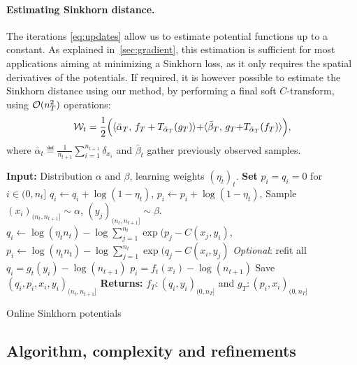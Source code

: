 \paragraph{Estimating Sinkhorn distance.} 

The iterations \eqref{eq:updates} allow us to estimate potential functions up to a constant. As explained in~\autoref{sec:gradient},
this estimation is sufficient for most applications aiming at minimizing a Sinkhorn loss, as it only requires the spatial derivatives of the potentials.
%
If required, it is however possible to estimate the Sinkhorn distance using our method, by performing a final soft $C$-transform, using $\Oo(n_T^2)$ operations:
\begin{equation}\label{eq-dist-est}
    \Ww_t = \frac{1}{2}\Big(\dotp{\bar \alpha_T}{f_T + \Ctrans{g_T}{\bar \alpha_T}}
     {+} \dotp{\bar \beta_T}{g_T {+} \Ctrans{f_T}{\bar \alpha_T}}\Big),
\end{equation}
where $\bar \alpha_t \eqdef \frac{1}{n_{t+1}}\sum_{i=1}^{n_{t+1}} \delta_{x_i}$
and $\bar \beta_t$ gather previously observed samples.

\begin{algorithm}[t]
    \begin{algorithmic}
    \State \textbf{Input:} Distribution $\alpha$ and $\beta$, learning weights ${(\eta_t)}_t$. 
    \textbf{Set} $p_i = q_i = 0$ for $i \in (0, n_t]$
        \For{$i \in (0, n_t]$}
        \State $q_i \gets q_i + \log(1 - \eta_t)$, $p_i \gets p_i + \log(1 - \eta_t)$,
        \EndFor
        \State Sample $(x_i)_{(n_t, n_{t+1}]} \sim \alpha$, $(y_j)_{(n_t, n_{t+1}]} \sim \beta$.
        \For{$i \in (n_t, n_{t+1}]$}
            \State $q_i {\gets} 
            \log(\eta_t n_t) {-} \log 
            \sum_{j=1}^{n_t} \exp(p_j {-} C(x_j, y_i)$,\: $p_i {\gets} 
            \log(\eta_t n_t) {-} \log 
            \sum_{j=1}^{n_t} \exp(q_j {-} C(x_i, y_j)$
        \EndFor
        \State \textit{Optional}: refit all $q_i = g_t(y_i) - \log (n_{t+1})$ \quad
         $p_i = f_t(x_i) - \log (n_{t+1})$
        \State Save $(q_i, p_i, x_i, y_i)_{(n_t,n_{t+1}]}$
    \EndFor
    \State \textbf{Returns:} $f_T : (q_i, y_i)_{(0, n_T]}$ and
    $g_T : (p_i, x_i)_{(0, n_T]}$
    \end{algorithmic}
    \caption{Online Sinkhorn potentials}\label{alg:online_sinkhorn}
\end{algorithm}


\subsection{Algorithm, complexity and refinements}\label{sec:alg}

